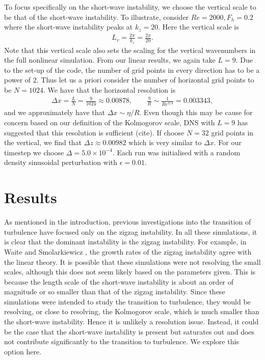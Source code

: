 To focus specifically on the short-wave instability, we choose the vertical scale to be that of the short-wave instability. To illustrate, consider $Re=2000, F_{h}=0.2$ where the short-wave instability peaks at $k_{z}=20$. Here the vertical scale is 
\begin{align}
L_{v} = \frac{2\pi}{k_{z}} = \frac{2\pi}{20}.
\end{align}
Note that this vertical scale also sets the scaling for the vertical wavenumbers in the full nonlinear simulation. From our linear results, we again take $L=9$. Due to the set-up of the code, the number of grid points in every direction has to be a power of $2$. Thus let us a priori consider the number of horizontal grid points to be $N=1024$. We have that the horizontal resolution is
\begin{align}
\Delta x = \frac{L}{N} = \frac{9}{1024}\approx 0.00878,\qquad \frac{\eta}{R}\sim \frac{1}{Re^{3/4}}=0.003343,
\end{align}
and we approximately have that $\Delta x \sim \eta/R$. Even though this may be cause for concern based on our definition of the Kolmogorov scale, DNS with $L=9$ has suggested that this resolution is sufficient (cite). If choose $N=32$ grid points in the vertical, we find that $\Delta z \approx 0.00982$ which is very similar to $\Delta x$. For our timestep we choose $\Delta = 5.0\times 10^{-4}$. Each run was initialised with a random density sinusoidal perturbation with $\epsilon=0.01$. 


\section{Results}
As mentioned in the introduction, previous investigations into the transition of turbulence have focused only on the zigzag instability. In all these simulations, it is clear that the dominant instability is the zigzag instability. For example, in Waite and Smolarkiewicz \cite{waitesmol2008}, the growth rates of the zigzag instability agree with the linear theory. It is possible that these simulations were not resolving the small scales, although this does not seem likely based on the parameters given. This is because the length scale of the short-wave instability is about an order of magnitude or so smaller than that of the zigzag instability. Since these simulations were intended to study the transition to turbulence, they would be resolving, or close to resolving, the Kolmogorov scale, which is much smaller than the short-wave instability. Hence it is unlikely a resolution issue. Instead, it could be the case that the short-wave instability is present but saturates out and does not contribute significantly to the transition to turbulence. We explore this option here. 

